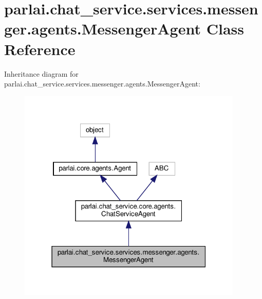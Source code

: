 \hypertarget{classparlai_1_1chat__service_1_1services_1_1messenger_1_1agents_1_1MessengerAgent}{}\section{parlai.\+chat\+\_\+service.\+services.\+messenger.\+agents.\+Messenger\+Agent Class Reference}
\label{classparlai_1_1chat__service_1_1services_1_1messenger_1_1agents_1_1MessengerAgent}


Inheritance diagram for parlai.\+chat\+\_\+service.\+services.\+messenger.\+agents.\+Messenger\+Agent\+:
\nopagebreak
\begin{figure}[H]
\begin{center}
\leavevmode
\includegraphics[width=304pt]{d7/da0/classparlai_1_1chat__service_1_1services_1_1messenger_1_1agents_1_1MessengerAgent__inherit__graph}
\end{center}
\end{figure}


